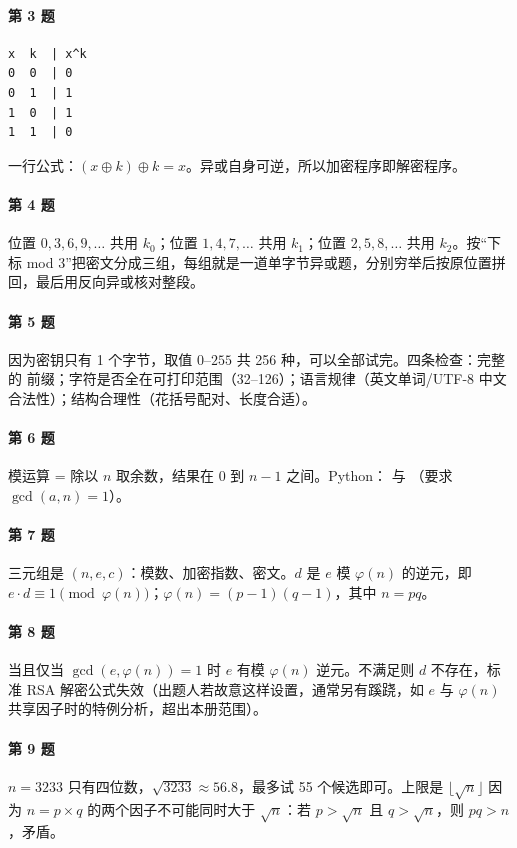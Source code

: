 \documentclass[UTF8,12pt,oneside]{ctexbook}
\begin{document}
\paragraph{第 3 题}
\begin{lstlisting}
x  k  | x^k
0  0  | 0
0  1  | 1
1  0  | 1
1  1  | 0
\end{lstlisting}
一行公式：$(x \oplus k) \oplus k = x$。异或自身可逆，所以加密程序即解密程序。

\paragraph{第 4 题}位置 $0, 3, 6, 9, \dots$ 共用 $k_0$；位置 $1, 4, 7, \dots$ 共用 $k_1$；位置 $2, 5, 8, \dots$ 共用 $k_2$。按“下标 mod 3”把密文分成三组，每组就是一道单字节异或题，分别穷举后按原位置拼回，最后用反向异或核对整段。

\paragraph{第 5 题}因为密钥只有 1 个字节，取值 $0$--$255$ 共 256 种，可以全部试完。四条检查：完整的  前缀；字符是否全在可打印范围（32--126）；语言规律（英文单词/UTF-8 中文合法性）；结构合理性（花括号配对、长度合适）。

\paragraph{第 6 题}模运算 = 除以 $n$ 取余数，结果在 $0$ 到 $n-1$ 之间。Python： 与 （要求 $\gcd(a, n) = 1$）。

\paragraph{第 7 题}三元组是 $(n, e, c)$：模数、加密指数、密文。$d$ 是 $e$ 模 $\varphi(n)$ 的逆元，即 $e \cdot d \equiv 1 \pmod{\varphi(n)}$；$\varphi(n) = (p-1)(q-1)$，其中 $n = pq$。

\paragraph{第 8 题}当且仅当 $\gcd(e, \varphi(n)) = 1$ 时 $e$ 有模 $\varphi(n)$ 逆元。不满足则 $d$ 不存在，标准 RSA 解密公式失效（出题人若故意这样设置，通常另有蹊跷，如 $e$ 与 $\varphi(n)$ 共享因子时的特例分析，超出本册范围）。

\paragraph{第 9 题}$n = 3233$ 只有四位数，$\sqrt{3233} \approx 56.8$，最多试 55 个候选即可。上限是 $\lfloor\sqrt{n}\rfloor$ 因为 $n = p \times q$ 的两个因子不可能同时大于 $\sqrt{n}$：若 $p > \sqrt{n}$ 且 $q > \sqrt{n}$，则 $pq > n$，矛盾。
\end{document}
